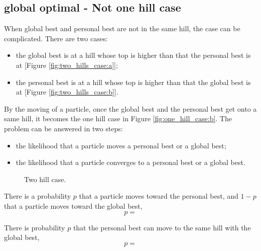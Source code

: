 \subsection{global optimal - Not one hill case}

When global best and personal best are not in the same hill, the case can be complicated.
There are two cases:
\begin{itemize}
\item the global best is at a hill whose top is higher than that the personal best is at [Figure \ref{fig:two_hills_case:a}];
\item the personal best is at a hill whose top is higher than that the global best is at [Figure \ref{fig:two_hills_case:b}]. 
\end{itemize}
By the moving of a particle, once the global best and the personal best get onto a same hill, it becomes the one hill case in Figure \ref{fig:one_hill_case:b}.
The problem can be answered in two steps:
\begin{itemize}
\item the likelihood that a particle moves a personal best or a global best;
\item the likelihood that a particle converges to a personal best or a global best.
\end{itemize}

\begin{figure}
\centering
{}
\caption{Two hill case.}
\label{fig:two_hills_case}
\end{figure}


\begin{theorem}
There is a probability $ p $  that a particle moves toward the personal best, and $ 1 - p $ that a particle moves toward the global best,
\begin{equation}
p = 
\end{equation}
\end{theorem}

\begin{corollary}
There is probability $ p $ that the personal best can move to the same hill with the global best,
\begin{equation}
p = 
\end{equation}
\end{corollary}